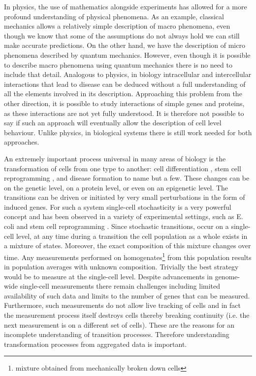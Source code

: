 In physics, the use of mathematics alongside experiments has allowed for a more profound understanding of physical phenomena. As an example, classical mechanics allows a relatively simple description of macro phenomena, even though we know that some of the assumptions do not always hold we can still make accurate predictions. On the other hand, we have the description of micro phenomena described by quantum mechanics. However, even though it is possible to describe macro phenomena using quantum mechanics there is no need to include that detail. %
Analogous to physics, in biology intracellular and intercellular interactions that lead to disease can be deduced without a full understanding of all the elements involved in its description. Approaching this problem from the other direction, it is possible to study interactions of simple genes and proteins, as these interactions are not yet fully understood. It is therefore not possible to say if such an approach will eventually allow the description of cell level behaviour. Unlike physics, in biological systems there is still work needed for both approaches.

An extremely important process universal in many areas of biology is the transformation of cells from one type to another: cell differentiation \citep{Tang:2010ed, Vierbuchen:2010fa}, stem cell reprogramming \citep{Takahashi:2006hi, Hanna:2010jy}, and disease formation \citep{Hannah:2000wo, Vogel:2010jb} to name but a few. These changes can be on the genetic level, on a protein level, or even on an epigenetic level. The transitions can be driven or initiated by very small perturbations in the form of induced genes. For such a system single-cell stochasticity is a very powerful concept and has been observed in a variety of experimental settings, such as E. coli  \citep{Elowitz:2002hb} and stem cell reprogramming \citep{Hanna:2009ix}. Since stochastic transitions, occur on a single-cell level, at any time during a transition the cell population as a whole exists in a mixture of states. Moreover, the exact composition of this mixture changes over time. Any measurements performed on homogenates\footnote{mixture obtained from mechanically broken down cells} from this population results in population averages with unknown composition. Trivially the best strategy would be to measure at the single-cell level. Despite advancements in genome-wide single-cell measurements \citep{deSouza:2012dz, Tang:2011gt} there remain challenges including limited availability of such data and limits to the number of genes that can be measured. Furthermore, such measurements do not allow live tracking of cells and in fact the measurement process itself destroys cells thereby breaking continuity (i.e. the next measurement is on a different set of cells). These are the reasons for an incomplete understanding of transition processes. Therefore understanding transformation processes from aggregated data is important.

